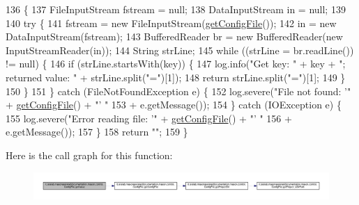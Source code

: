 \begin{DoxyCode}
136                                               \{
137         FileInputStream fstream = null;
138         DataInputStream in = null;
139 
140         \textcolor{keywordflow}{try} \{
141             fstream = \textcolor{keyword}{new} FileInputStream(\hyperlink{classit_1_1isislab_1_1masonassisteddocumentation_1_1mason_1_1control_1_1_config_file_af791ff01652e95f6385641909b805e20}{getConfigFile}());
142             in = \textcolor{keyword}{new} DataInputStream(fstream);
143             BufferedReader br = \textcolor{keyword}{new} BufferedReader(\textcolor{keyword}{new} InputStreamReader(in));
144             String strLine;
145             \textcolor{keywordflow}{while} ((strLine = br.readLine()) != null) \{
146                 \textcolor{keywordflow}{if} (strLine.startsWith(key)) \{
147                     log.info(\textcolor{stringliteral}{"Get key: "} + key + \textcolor{stringliteral}{"; returned value: "} + strLine.split(\textcolor{stringliteral}{"="})[1]);
148                     \textcolor{keywordflow}{return} strLine.split(\textcolor{stringliteral}{"="})[1];
149                 \}
150             \}
151         \} \textcolor{keywordflow}{catch} (FileNotFoundException e) \{
152             log.severe(\textcolor{stringliteral}{"File not found: '"} + \hyperlink{classit_1_1isislab_1_1masonassisteddocumentation_1_1mason_1_1control_1_1_config_file_af791ff01652e95f6385641909b805e20}{getConfigFile}() + \textcolor{stringliteral}{"' "}
153                     + e.getMessage());
154         \} \textcolor{keywordflow}{catch} (IOException e) \{
155             log.severe(\textcolor{stringliteral}{"Error reading file: '"} + \hyperlink{classit_1_1isislab_1_1masonassisteddocumentation_1_1mason_1_1control_1_1_config_file_af791ff01652e95f6385641909b805e20}{getConfigFile}() + \textcolor{stringliteral}{"' "}
156                     + e.getMessage());
157         \}
158         \textcolor{keywordflow}{return} \textcolor{stringliteral}{""};
159     \}
\end{DoxyCode}


Here is the call graph for this function\-:\nopagebreak
\begin{figure}[H]
\begin{center}
\leavevmode
\includegraphics[width=350pt]{classit_1_1isislab_1_1masonassisteddocumentation_1_1mason_1_1control_1_1_config_file_abb43073f42616e4349b2fcb4e964c648_cgraph}
\end{center}
\end{figure}




